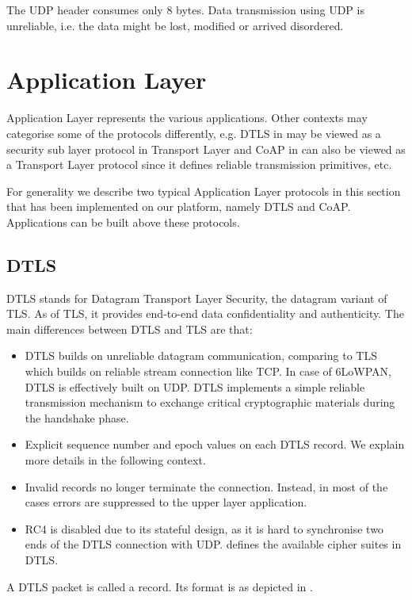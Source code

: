 The UDP header consumes only 8 bytes. Data transmission using UDP is unreliable, i.e. the data might be lost, modified or arrived disordered. 

\section{Application Layer}
Application Layer represents the various applications. Other contexts may categorise some of the protocols differently, e.g. DTLS in  may be viewed as a security sub layer protocol in Transport Layer and CoAP in  can also be viewed as a Transport  Layer protocol since it defines reliable transmission primitives, etc.

For generality we describe two typical Application Layer protocols in this section that has been implemented on our platform, namely DTLS\cite{rfc6347} and CoAP\cite{rfc7252}. Applications can be built above these protocols.

\subsection{DTLS} \label{Subsec: DTLS}
DTLS\cite{rfc6347} stands for Datagram Transport Layer Security, the datagram variant of TLS. As of TLS, it provides end-to-end data confidentiality and authenticity. The main differences between DTLS and TLS are that:

\begin{itemize}
	\item DTLS builds on unreliable datagram communication, comparing to TLS which builds on reliable stream connection like TCP. In case of 6LoWPAN, DTLS is effectively built on UDP. DTLS implements a simple reliable transmission mechanism to exchange critical cryptographic materials during the handshake phase.
	\item Explicit sequence number and epoch values on each DTLS record. We explain more details in the following context.
	\item Invalid records no longer terminate the connection. Instead, in most of the cases errors are suppressed to the upper layer application.
	\item RC4 is disabled due to its stateful design,  as it is hard to synchronise two ends of the DTLS connection with UDP. \cite{DtlsCiphers} defines the available cipher suites in DTLS.
\end{itemize}

A DTLS packet is called a record. Its format is as depicted in .

